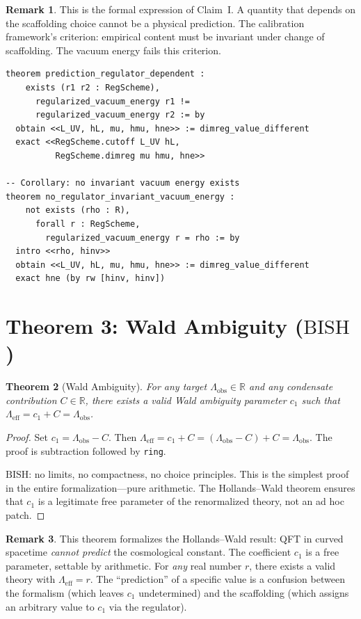 \documentclass[11pt,a4paper]{article}
\theoremstyle{plain}
\newtheorem{theorem}{Theorem}[section]
\theoremstyle{definition}
\newtheorem{remark}[theorem]{Remark}
\newcommand{\RR}{\mathbb{R}}
\newcommand{\BISH}{\ensuremath{\mathrm{BISH}}}
\newcommand{\Lobs}{\Lambda_{\mathrm{obs}}}
\newcommand{\Leff}{\Lambda_{\mathrm{eff}}}
\begin{document}
\begin{remark}
This is the formal expression of Claim~I.  A quantity that depends on
the scaffolding choice cannot be a physical prediction.  The calibration
framework's criterion: empirical content must be invariant under
change of scaffolding.  The vacuum energy fails this criterion.
\end{remark}

\begin{lstlisting}[caption={Regulator dependence: \texttt{RegulatorDependence.lean}}]
theorem prediction_regulator_dependent :
    exists (r1 r2 : RegScheme),
      regularized_vacuum_energy r1 !=
      regularized_vacuum_energy r2 := by
  obtain <<L_UV, hL, mu, hmu, hne>> := dimreg_value_different
  exact <<RegScheme.cutoff L_UV hL,
          RegScheme.dimreg mu hmu, hne>>

-- Corollary: no invariant vacuum energy exists
theorem no_regulator_invariant_vacuum_energy :
    not exists (rho : R),
      forall r : RegScheme,
        regularized_vacuum_energy r = rho := by
  intro <<rho, hinv>>
  obtain <<L_UV, hL, mu, hmu, hne>> := dimreg_value_different
  exact hne (by rw [hinv, hinv])
\end{lstlisting}

\section{Theorem 3: Wald Ambiguity ($\BISH$)}\label{sec:wald}

\begin{theorem}[Wald Ambiguity]\label{thm:wald}
For any target $\Lobs \in \RR$ and any condensate contribution
$C \in \RR$, there exists a valid Wald ambiguity parameter $c_1$
such that $\Leff = c_1 + C = \Lobs$.
\end{theorem}

\begin{proof}
Set $c_1 = \Lobs - C$.  Then
$\Leff = c_1 + C = (\Lobs - C) + C = \Lobs.$
The proof is subtraction followed by \texttt{ring}.

$\BISH$: no limits, no compactness, no choice principles.
This is the simplest proof in the entire formalization---pure arithmetic.
The Hollands--Wald theorem ensures that $c_1$ is a legitimate
free parameter of the renormalized theory, not an ad hoc patch.
\end{proof}

\begin{remark}
This theorem formalizes the Hollands--Wald result: QFT in curved spacetime
\emph{cannot predict} the cosmological constant.  The coefficient $c_1$
is a free parameter, settable by arithmetic.  For \emph{any} real number
$r$, there exists a valid theory with $\Leff = r$.  The ``prediction''
of a specific value is a confusion between the formalism (which leaves
$c_1$ undetermined) and the scaffolding (which assigns an arbitrary
value to $c_1$ via the regulator).
\end{remark}
\end{document}
